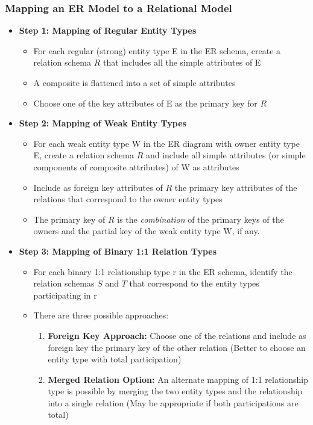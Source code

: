 \subsubsection{Mapping an ER Model to a Relational Model}
\begin{itemize}[label=\(\rhd\)]
    \item \textbf{Step 1: Mapping of Regular Entity Types}
    \begin{itemize}[label=\(\rhd\)]
        \item For each regular (strong) entity type E in the ER schema, create a relation schema $R$ that includes all the simple attributes of E
        \item A composite is flattened into a set of simple attributes
        \item Choose one of the key attributes of E as the primary key for $R$
    \end{itemize}
    \item \textbf{Step 2: Mapping of Weak Entity Types}
    \begin{itemize}[label=\(\rhd\)]
        \item For each weak entity type W in the ER diagram with owner entity type E, create a relation schema $R$ and include all simple attributes (or simple components of composite attributes) of W as attributes
        \item Include as foreign key attributes of $R$ the primary key attributes of the relations that correspond to the owner entity types
        \item The primary key of $R$ is the \textit{combination} of the primary keys of the owners and the partial key of the weak entity type W, if any.
    \end{itemize}
    \item \textbf{Step 3: Mapping of Binary 1:1 Relation Types}
    \begin{itemize}[label=\(\rhd\)]
        \item For each binary 1:1 relationship type r in the ER schema, identify the relation schemas $S$ and $T$ that correspond to the entity types participating in r
        \item There are three possible approaches:
        \begin{enumerate}
            \item \textbf{Foreign Key Approach:} Choose one of the relations and include as foreign key the primary key of the other relation (Better to choose an entity type with total participation)
            \item \textbf{Merged  Relation Option:} An alternate mapping of 1:1 relationship type is possible by merging the two entity types and the relationship into a single relation (May be appropriate if both participations are total)

\end{enumerate}
\end{itemize}
\end{itemize}
